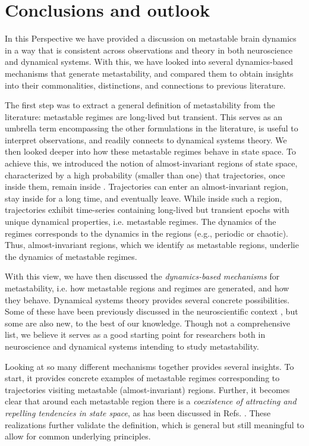 \section{Conclusions and outlook}
In this Perspective we have provided a discussion on metastable brain dynamics in a way that is consistent across observations and theory in both neuroscience and dynamical systems. With this, we have looked into several dynamics-based mechanisms that generate metastability, and compared them to obtain insights into their commonalities, distinctions, and connections to previous literature.

The first step was to extract a general definition of metastability from the literature: metastable regimes are long-lived but transient. This serves as an umbrella term encompassing the other formulations in the literature, is useful to interpret observations, and readily connects to dynamical systems theory. We then looked deeper into how these metastable regimes behave in state space. To achieve this, we introduced the notion of almost-invariant regions of state space, characterized by a high probability (smaller than one) that trajectories, once inside them, remain inside \cite{froyland2005statistically, dellnitz2003congestion}. Trajectories can enter an almost-invariant region, stay inside for a long time, and eventually leave. While inside such a region, trajectories exhibit time-series containing long-lived but transient epochs with unique dynamical properties, i.e. metastable regimes. The dynamics of the regimes corresponds to the dynamics in the regions (e.g., periodic or chaotic). Thus, almost-invariant regions, which we identify as metastable regions, underlie the dynamics of metastable regimes. 

With this view, we have then discussed the \textit{dynamics-based mechanisms} for metastability, i.e. how metastable regions and regimes are generated, and how they behave. Dynamical systems theory provides several concrete possibilities. Some of these have been previously discussed in the neuroscientific context \cite{graben2019metastable, cavanna2018dynamic, brinkman2022metastable}, but some are also new, to the best of our knowledge. Though not a comprehensive list, we believe it serves as a good starting point for researchers both in neuroscience and dynamical systems intending to study metastability. 

Looking at so many different mechanisms together provides several insights. To start, it provides concrete examples of metastable regimes corresponding to trajectories visiting metastable (almost-invariant) regions. Further, it becomes clear that around each metastable region there is a \textit{coexistence of attracting and repelling tendencies in state space}, as has been discussed in Refs. \cite{tognoli2014metastable, kaneko2003chaotic}. These realizations further validate the definition, which is general but still meaningful to allow for common underlying principles.


